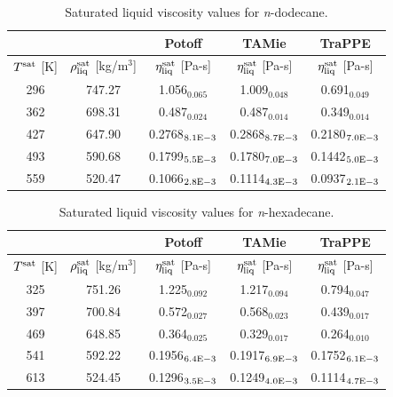 \documentclass[preprint,review,12pt]{elsarticle}
\begin{document}
	\begin{table}[H]
		\caption{Saturated liquid viscosity values for \textit{n}-dodecane.}
		\begin{center}
			\begin{tabular}{|c|c|c|c|c|}
				\hline
				&                                       & Potoff            & TAMie             & TraPPE            \\ \hline
				$T^{\rm sat}$ {[}K{]} & $\rho^{\rm sat}_{\rm liq}$ [kg/m$^3$] & $\eta_{\rm liq}^{\rm sat}$ {[}Pa-s{]} & $\eta_{\rm liq}^{\rm sat}$ {[}Pa-s{]} & $\eta_{\rm liq}^{\rm sat}$ {[}Pa-s{]} \\ \hline
				296 & 747.27 & 1.056$_{0.065}$   & 1.009$_{0.048}$   & 0.691$_{0.049}$   \\ \hline
				362 & 698.31 & 0.487$_{0.024}$   & 0.487$_{0.014}$   & 0.349$_{0.014}$   \\ \hline
				427 & 647.90 & 0.2768$_{8.1 \rm E-3}$ & 0.2868$_{8.7 \rm E-3}$ & 0.2180$_{7.0 \rm E-3}$ \\ \hline
				493 & 590.68 & 0.1799$_{5.5 \rm E-3}$ & 0.1780$_{7.0 \rm E-3}$ & 0.1442$_{5.0 \rm E-3}$ \\ \hline
				559 & 520.47 & 0.1066$_{2.8 \rm E-3}$ & 0.1114$_{4.3 \rm E-3}$ & 0.0937$_{2.1 \rm E-3}$ \\ \hline
			\end{tabular}
		\end{center}
	\end{table}
	
	\begin{table}[H]
		\caption{Saturated liquid viscosity values for \textit{n}-hexadecane.}
		\begin{center}
			\begin{tabular}{|c|c|c|c|c|}
				\hline
				&                                       & Potoff            & TAMie             & TraPPE            \\ \hline
				$T^{\rm sat}$ {[}K{]} & $\rho^{\rm sat}_{\rm liq}$ [kg/m$^3$] & $\eta_{\rm liq}^{\rm sat}$ {[}Pa-s{]} & $\eta_{\rm liq}^{\rm sat}$ {[}Pa-s{]} & $\eta_{\rm liq}^{\rm sat}$ {[}Pa-s{]} \\ \hline
				325 & 751.26 & 1.225$_{0.092}$   & 1.217$_{0.094}$   & 0.794$_{0.047}$   \\ \hline
				397 & 700.84 & 0.572$_{0.027}$   & 0.568$_{0.023}$   & 0.439$_{0.017}$   \\ \hline
				469 & 648.85 & 0.364$_{0.025}$   & 0.329$_{0.017}$   & 0.264$_{0.010}$   \\ \hline
				541 & 592.22 & 0.1956$_{6.4 \rm E-3}$ & 0.1917$_{6.9 \rm E-3}$ & 0.1752$_{6.1 \rm E-3}$ \\ \hline
				613 & 524.45 & 0.1296$_{3.5 \rm E-3}$ & 0.1249$_{4.0 \rm E-3}$ & 0.1114$_{4.7 \rm E-3}$ \\ \hline
			\end{tabular}
		\end{center}
	\end{table}
	
\end{document}
